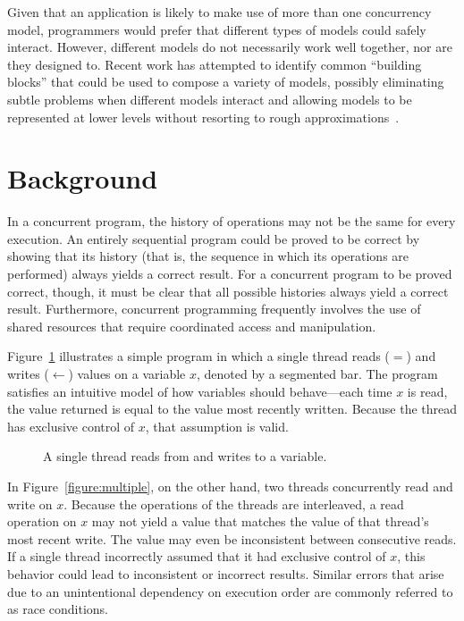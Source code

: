 \documentclass{sig-alternate}
\begin{document}
Given that an application is likely to make use of more than one concurrency model, programmers would prefer that different types of models could safely interact. However, different models do not necessarily work well together, nor are they designed to. Recent work has attempted to identify common ``building blocks'' that could be used to compose a variety of models, possibly eliminating subtle problems when different models interact and allowing models to be represented at lower levels without resorting to rough approximations~\cite{Marr2009, Marr2012, Swalens2014, Ziv2015}.

\section{Background}

In a concurrent program, the history of operations may not be the same for every execution. An entirely sequential program could be proved to be correct by showing that its history (that is, the sequence in which its operations are performed) always yields a correct result. For a concurrent program to be proved correct, though, it must be clear that all possible histories always yield a correct result. Furthermore, concurrent programming frequently involves the use of shared resources that require coordinated access and manipulation.

Figure~\ref{figure:single} illustrates a simple program in which a single thread reads ($=$) and writes ($\leftarrow$) values on a variable $x$, denoted by a segmented bar. The program satisfies an intuitive model of how variables should behave---each time $x$ is read, the value returned is equal to the value most recently written. Because the thread has exclusive control of $x$, that assumption is valid.

\begin{figure}[ht]
  \centering
  \resizebox{\linewidth}{!}{}
  \caption{A single thread reads from and writes to a variable.}
\label{figure:single}
\end{figure}

In Figure~\ref{figure:multiple}, on the other hand, two threads concurrently read and write on $x$. Because the operations of the threads are interleaved, a read operation on $x$ may not yield a value that matches the value of that thread's most recent write. The value may even be inconsistent between consecutive reads. If a single thread incorrectly assumed that it had exclusive control of $x$, this behavior could lead to inconsistent or incorrect results. Similar errors that arise due to an unintentional dependency on execution order are commonly referred to as race conditions.
\end{document}
